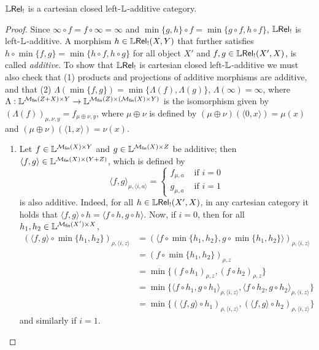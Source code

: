 



\begin{proposition}
$\mathbb{L} \mathsf{Rel}_!$ is a cartesian closed left-$\mathbb{L}$-additive category.
\end{proposition}
\begin{proof} 
Since $\infty \circ f= f\circ \infty=\infty$ and $\min\{g,h\}\circ f= \min\{g\circ f, h\circ f \}$, $\mathbb{L} \mathsf{Rel}_!$ is {left-$\mathbb{L}$-additive}.
A morphism $h\in \mathbb{L} \mathsf{Rel}_!(X,Y)$ that further satisfies $h\circ \min\{f,g\}=\min\{h\circ f, h\circ g\}$ for all object $X'$ and $f,g\in \mathbb{L} \mathsf{Rel}_!(X',X)$, is called \emph{additive}.
To show that $\mathbb{L} \mathsf{Rel}_!$ is cartesian closed left-$\mathbb{L}$-additive we must also check that (1) products and projections of additive morphisms are additive, and that (2) $\Lambda(\min\{f,g\})=\min\{\Lambda(f),\Lambda(g)\}$, $\Lambda(\infty)=\infty$, where $\Lambda:\mathbb{L}^{\mathcal{M}_{\mathsf{fin}}(Z+X)\times Y}\to \mathbb{L}^{\mathcal{M}_{\mathsf{fin}}(Z)\times( \mathcal{M}_{\mathsf{fin}}(X)\times Y)}$ is the isomorphism given by
$(\Lambda(f))_{\mu,\nu,y}= f_{\mu\oplus\nu,y}$, where 
 $\mu\oplus\nu$ is defined by $(\mu\oplus\nu)(\langle 0,x\rangle)=\mu(x)$ and $(\mu\oplus \nu)(\langle 1,x\rangle)=\nu(x)$.
	\begin{enumerate}
	\item  Let $f\in \mathbb{L}^{\mathcal{M}_{\mathsf{fin}}(X)\times Y}$ and $g\in \mathbb{L}^{\mathcal{M}_{\mathsf{fin}}(X)\times Z}$ be additive; then $\langle f,g\rangle \in \mathbb{L}^{\mathcal{M}_{\mathsf{fin}}(X)\times (Y+Z)}$, which is defined by 
	$$
	\langle f,g\rangle_{\mu,\langle i,a\rangle}= \begin{cases}
	f_{\mu,a} & \text{ if }i=0\\
	g_{\mu,a} & \text{ if }i=1
	\end{cases}
	$$
	is also additive. Indeed, for all $h\in \mathbb{L} \mathsf{Rel}_!(X',X)$, 
	in any cartesian category it holds that $\langle f,g\rangle \circ h=\langle f\circ h, g\circ h\rangle$. Now, 
		if $i=0$, then for all $h_{1},h_{2}\in \mathbb{L}^{\mathcal{M}_{\mathsf{fin}}(X')\times X}$, 
	\begin{align*}
	(\langle f,g\rangle\circ \min\{h_{1},h_{2}\})_{\rho,\langle i,z\rangle}&=
	(\langle f\circ  \min\{h_{1},h_{2}\},g\circ  \min\{h_{1},h_{2}\}\rangle)_{\rho,\langle i,z\rangle} 
	\\
&=	(f\circ \min\{h_{1},h_{2}\})_{\rho, z}\\ &
	= \min\{(f\circ h_{1})_{\rho,z},(f\circ h_{2})_{\rho,z}\} \\
	&=
	\min\{ \langle f\circ h_{1},g\circ h_{1}\rangle_{\rho,\langle i,z\rangle}, 
	\langle f\circ h_{2},g\circ h_{2}\rangle_{\rho,\langle i,z\rangle}
\}
	\\
	& = \min\{ (\langle f,g\rangle\circ h_{1})_{\rho,\langle i,z\rangle},(\langle f,g\rangle\circ h_{2})_{\rho,\langle i,z\rangle}\}	\end{align*}
	and similarly if $i=1$.
	

\end{enumerate}
\end{proof}
